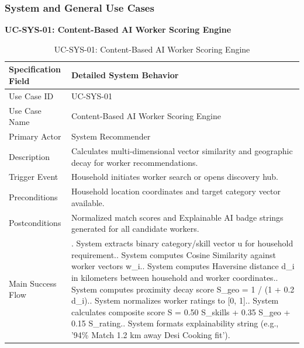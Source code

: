 \documentclass[12pt,a4paper]{article}
\begin{document}
\subsubsection{System and General Use Cases}
\noindent\textbf{UC-SYS-01: Content-Based AI Worker Scoring Engine}\par
\vspace{4pt}
\begingroup\small\setlength{\tabcolsep}{3pt}\renewcommand{\arraystretch}{1.15}
\begin{longtable}{|>{\raggedright\arraybackslash}p{\dimexpr(\linewidth-4\tabcolsep-3\arrayrulewidth)/2\relax}|>{\raggedright\arraybackslash}p{\dimexpr(\linewidth-4\tabcolsep-3\arrayrulewidth)/2\relax}|}
\caption{UC-SYS-01: Content-Based AI Worker Scoring Engine}\label{tab:uc-sys-01}\\
\hline
Specification Field & Detailed System Behavior \\ \hline
Use Case ID & UC-SYS-01 \\ \hline
Use Case Name & Content-Based AI Worker Scoring Engine \\ \hline
Primary Actor & System Recommender \\ \hline
Description & Calculates multi-dimensional vector similarity and geographic decay for worker recommendations. \\ \hline
Trigger Event & Household initiates worker search or opens discovery hub. \\ \hline
Preconditions & Household location coordinates and target category vector available. \\ \hline
Postconditions & Normalized match scores and Explainable AI badge strings generated for all candidate workers. \\ \hline
Main Success Flow & 1. System extracts binary category/\allowbreak{}skill vector u for household requirement.\newline 2. System computes Cosine Similarity against worker vectors w\_\allowbreak{}i.\newline 3. System computes Haversine distance d\_\allowbreak{}i in kilometers between household and worker coordinates.\newline 4. System computes proximity decay score S\_\allowbreak{}geo = 1 / (1 + 0.2 d\_\allowbreak{}i).\newline 5. System normalizes worker ratings to [0, 1].\newline 6. System calculates composite score S = 0.50 S\_\allowbreak{}skills + 0.35 S\_\allowbreak{}geo + 0.15 S\_\allowbreak{}rating.\newline 7. System formats explainability string (e.g., '94\% Match \textbullet{} 1.2 km away \textbullet{} Desi Cooking fit'). \\ \hline
\end{longtable}
\end{document}
